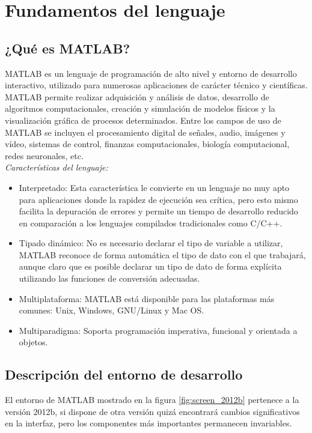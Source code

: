 \chapter{Fundamentos del lenguaje}
 
\section{¿Qué es MATLAB?}

MATLAB es un lenguaje de programación de alto nivel y entorno de
desarrollo interactivo, utilizado para numerosas aplicaciones de
carácter técnico y científicas. MATLAB permite realizar adquisición y
análisis de datos, desarrollo de algoritmos computacionales, creación y
simulación de modelos físicos y la visualización gráfica de procesos
determinados. Entre los campos de uso de MATLAB se incluyen el
procesamiento digital de señales, audio, imágenes y vídeo, sistemas de
control, finanzas computacionales, biología computacional, redes
neuronales, etc. \\

\emph{Características del lenguaje:} 

\begin{itemize}
\item
  Interpretado: Esta característica le convierte en un lenguaje no muy
  apto para aplicaciones donde la rapidez de ejecución sea crítica, pero
  esto mismo facilita la depuración de errores y permite un tiempo de
  desarrollo reducido en comparación a los lenguajes compilados
  tradicionales como C/C++.
\item
  Tipado dinámico: No es necesario declarar el tipo de variable a
  utilizar, MATLAB reconoce de forma automática el tipo de dato con el
  que trabajará, aunque claro que es posible declarar un tipo de dato de
  forma explícita utilizando las funciones de conversión adecuadas.
\item
  Multiplataforma: MATLAB está disponible para las plataformas más
  comunes: Unix, Windows, GNU/Linux y Mac OS.
\item
  Multiparadigma: Soporta programación imperativa, funcional y orientada
  a objetos.
\end{itemize}

\section{Descripción del entorno de desarrollo}

El entorno de MATLAB mostrado en la figura \ref{fig:screen_2012b}
pertenece a la versión 2012b, si dispone de otra versión quizá
encontrará cambios significativos en la interfaz, pero los componentes
más importantes permanecen invariables. \\

